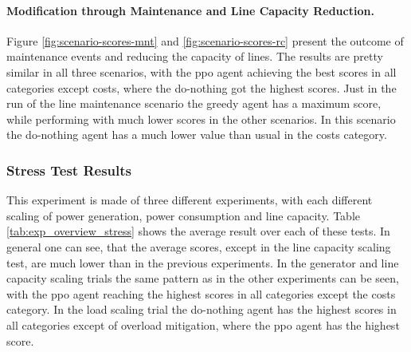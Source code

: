 \paragraph{Modification through Maintenance and Line Capacity Reduction.}
Figure \ref{fig:scenario-scores-mnt} and \ref{fig:scenario-scores-rc} present the outcome of maintenance events and reducing the capacity of lines. The results are pretty similar in all three scenarios, with the \ac{ppo} agent achieving the best scores in all categories except costs, where the do-nothing got the highest scores. Just in the run of the line maintenance scenario the greedy agent has a maximum score, while performing with much lower scores in the other scenarios. In this scenario the do-nothing agent has a much lower value than usual in the costs category.

\subsubsection{Stress Test Results}
This experiment is made of three different experiments, with each different scaling of power generation, power consumption and line capacity. Table \ref{tab:exp_overview_stress} shows the average result over each of these tests. In general one can see, that the average scores, except in the line capacity scaling test, are much lower than in the previous experiments. In the generator and line capacity scaling trials the same pattern as in the other experiments can be seen, with the \ac{ppo} agent reaching the highest scores in all categories except the costs category. In the load scaling trial the do-nothing agent has the highest scores in all categories except of overload mitigation, where the \ac{ppo} agent has the highest score.

